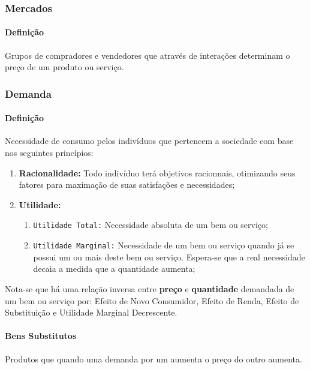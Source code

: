 \documentclass{article}
\begin{document}
        \subsubsection{Mercados}
            \paragraph{Definição}Grupos de compradores e vendedores que através de interações determinam o preço de um produto ou serviço.

        \subsubsection{Demanda}
            \paragraph{Definição}Necessidade de consumo pelos indivíduos que pertencem a sociedade com base nos seguintes princípios:
                \begin{enumerate}[rightmargin = \leftmargin]
                    \item \textbf{Racionalidade:} Todo indivíduo terá objetivos racionnais, otimizando seus fatores para maximação de suas satisfações e necessidades;
                    \item \textbf{Utilidade:}
                        \begin{enumerate}[noitemsep, rightmargin = \leftmargin]
                            \item \texttt{Utilidade Total:} Necessidade absoluta de um bem ou serviço;
                            \item \texttt{Utilidade Marginal:} Necessidade de um bem ou serviço quando já se possui um ou mais deste bem ou serviço. Espera-se que a real necessidade decaia a medida que a quantidade aumenta;
                        \end{enumerate}
                \end{enumerate}
            Nota-se que há uma relação inversa entre \textbf{preço} e \textbf{quantidade} demandada de um bem ou serviço por: Efeito de Novo Consumidor, Efeito de Renda, Efeito de Substituição e Utilidade Marginal Decrescente.

            \paragraph{Bens Substitutos}Produtos que quando uma demanda por um aumenta o preço do outro aumenta.
\end{document}
